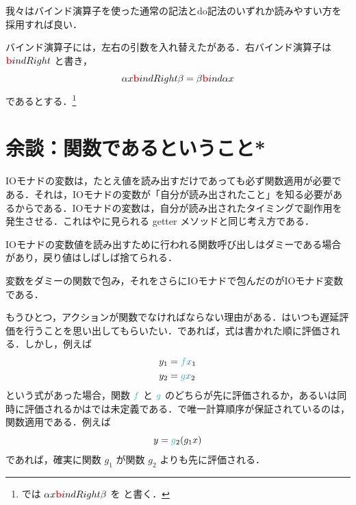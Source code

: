 \documentclass[a5paper,twoside,fleqn,draft]{jsbook}
\begin{document}

我々はバインド演算子を使った通常の記法とdo記法のいずれか読みやすい方を採用すれば良い．



\separator

バインド演算子には，左右の引数を入れ替えたがある．右バインド演算子は $\hTypeName{b}indRight$ と書き，
\begin{equation}
\alpha x\hTypeName{b}indRight\beta=\beta\hTypeName{b}ind\alpha x
\end{equation}
であるとする．\footnote{\haskell では $\alpha x\hTypeName{b}indRight\beta$ を  と書く．}

\section{余談：関数であるということ*}

IOモナドの変数は，たとえ値を読み出すだけであっても必ず関数適用が必要である．それは，IOモナドの変数が「自分が読み出されたこと」を知る必要があるからである．IOモナドの変数は，自分が読み出されたタイミングで副作用を発生させる．これは\objectivec や\swift に見られる getter メソッドと同じ考え方である．

IOモナドの変数値を読み出すために行われる関数呼び出しはダミーである場合があり，戻り値はしばしば捨てられる．

変数をダミーの関数で包み，それをさらにIOモナドで包んだのがIOモナド変数である．

もうひとつ，アクションが関数でなければならない理由がある．\haskell はいつも遅延評価を行うことを思い出してもらいたい．\python であれば，式は書かれた順に評価される．しかし，例えば
\begin{align}
y_1&=\hFunc{f} \hVar{x}_1\\
y_2&=\hFunc{g} \hVar{x}_2
\end{align}
という式があった場合，関数 $\hFunc{f}$ と $\hFunc{g}$ のどちらが先に評価されるか，あるいは同時に評価されるかは\haskell では未定義である．\haskell で唯一計算順序が保証されているのは，関数適用である．例えば
\begin{equation}
y=\hFunc{g}_2(g_1x)
\end{equation}
であれば，確実に関数 $g_1$ が関数 $g_2$ よりも先に評価される．
\end{document}
